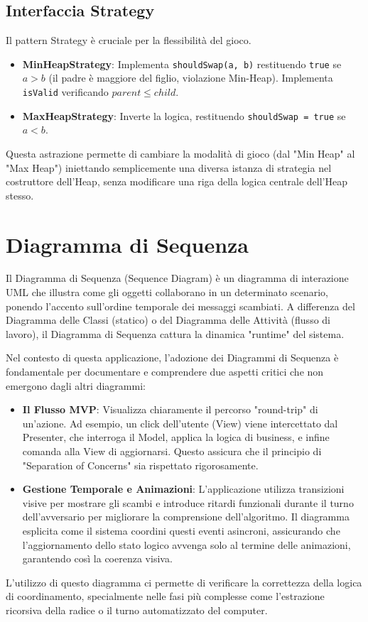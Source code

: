 \documentclass[openany]{theme/uniprthesis}
\begin{document}
\subsection{Interfaccia Strategy}
Il pattern Strategy è cruciale per la flessibilità del gioco.
\begin{itemize}
    \item \textbf{MinHeapStrategy}: Implementa \texttt{shouldSwap(a, b)} restituendo \texttt{true} se $a > b$ (il padre è maggiore del figlio, violazione Min-Heap). Implementa \texttt{isValid} verificando $parent \leq child$.
    \item \textbf{MaxHeapStrategy}: Inverte la logica, restituendo \texttt{shouldSwap = true} se $a < b$.
\end{itemize}
Questa astrazione permette di cambiare la modalità di gioco (dal "Min Heap" al "Max Heap") iniettando semplicemente una diversa istanza di strategia nel costruttore dell'Heap, senza modificare una riga della logica centrale dell'Heap stesso.

\section{Diagramma di Sequenza}
Il Diagramma di Sequenza (Sequence Diagram) è un diagramma di interazione UML che illustra come gli oggetti collaborano in un determinato scenario, ponendo l'accento sull'ordine temporale dei messaggi scambiati. A differenza del Diagramma delle Classi (statico) o del Diagramma delle Attività (flusso di lavoro), il Diagramma di Sequenza cattura la dinamica "runtime" del sistema.

Nel contesto di questa applicazione, l'adozione dei Diagrammi di Sequenza è fondamentale per documentare e comprendere due aspetti critici che non emergono dagli altri diagrammi:
\begin{itemize}
    \item \textbf{Il Flusso MVP}: Visualizza chiaramente il percorso "round-trip" di un'azione. Ad esempio, un click dell'utente (View) viene intercettato dal Presenter, che interroga il Model, applica la logica di business, e infine comanda alla View di aggiornarsi. Questo assicura che il principio di "Separation of Concerns" sia rispettato rigorosamente.
    \item \textbf{Gestione Temporale e Animazioni}: L'applicazione utilizza transizioni visive per mostrare gli scambi e introduce ritardi funzionali durante il turno dell'avversario per migliorare la comprensione dell'algoritmo. Il diagramma esplicita come il sistema coordini questi eventi asincroni, assicurando che l'aggiornamento dello stato logico avvenga solo al termine delle animazioni, garantendo così la coerenza visiva.
\end{itemize}
L'utilizzo di questo diagramma ci permette di verificare la correttezza della logica di coordinamento, specialmente nelle fasi più complesse come l'estrazione ricorsiva della radice o il turno automatizzato del computer.
\end{document}
